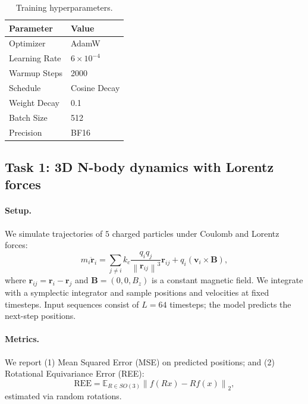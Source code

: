 \documentclass{article}
\theoremstyle{plain}
\theoremstyle{definition}
\theoremstyle{remark}
\newcommand{\norm}[1]{\left\lVert#1\right\rVert}
\begin{document}
\begin{table}[h]
\caption{Training hyperparameters.}
\label{tab:hyperparams}
\vskip 0.1in
\begin{center}
\begin{small}
\begin{sc}
\begin{tabular}{ll}
\toprule
Parameter & Value \\
\midrule
Optimizer & AdamW \\
Learning Rate & $6\times10^{-4}$ \\
Warmup Steps & 2000 \\
Schedule & Cosine Decay \\
Weight Decay & 0.1 \\
Batch Size & 512 \\
Precision & BF16 \\
\bottomrule
\end{tabular}
\end{sc}
\end{small}
\end{center}
\vskip -0.1in
\end{table}

\subsection{Task 1: 3D N-body dynamics with Lorentz forces}

\paragraph{Setup.}
We simulate trajectories of $5$ charged particles under Coulomb and Lorentz forces:
\begin{equation}
    m_i \ddot{\mathbf{r}}_i = \sum_{j\neq i} k_c \frac{q_i q_j}{\norm{\mathbf{r}_{ij}}^3}\mathbf{r}_{ij} + q_i (\mathbf{v}_i \times \mathbf{B}),
\end{equation}
where $\mathbf{r}_{ij} = \mathbf{r}_i - \mathbf{r}_j$ and $\mathbf{B}=(0,0,B_z)$ is a constant magnetic field. We integrate with a symplectic integrator and sample positions and velocities at fixed timesteps. Input sequences consist of $L=64$ timesteps; the model predicts the next-step positions.

\paragraph{Metrics.}
We report (1) Mean Squared Error (MSE) on predicted positions; and (2) Rotational Equivariance Error (REE):
\begin{equation}
    \mathrm{REE} = \mathbb{E}_{R\in SO(3)} \norm{f(Rx) - R f(x)}_2,
\end{equation}
estimated via random rotations.
\end{document}
